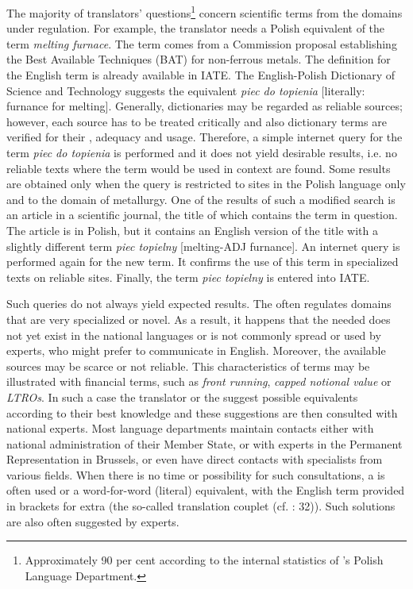 \documentclass[output=paper]{langsci/langscibook}
\begin{document}
\largerpage
The majority of translators’ questions\footnote{Approximately 90 per cent according to the internal statistics of ’s Polish Language Department.} concern scientific terms from the domains under regulation. For example, the translator needs a Polish equivalent of the term \textit{melting furnace}. The term comes from a Commission proposal establishing the Best Available Techniques (BAT) for non-ferrous metals. The definition for the English term is already available in IATE. The English-Polish Dictionary of Science and Technology \citep[692]{Berger2004} suggests the equivalent \textit{piec do topienia} [literally: furnance for melting]. Generally, dictionaries may be regarded as reliable sources; however, each source has to be treated critically and also dictionary terms are verified for their , adequacy and usage. Therefore, a simple internet query for the term \textit{piec do topienia} is performed and it does not yield desirable results, i.e. no reliable texts where the term would be used in context are found. Some results are obtained only when the query is restricted to sites in the Polish language only and to the domain of metallurgy. One of the results of such a modified search is an article in a scientific journal, the title of which contains the term in question. The article is in Polish, but it contains an English version of the title with a slightly different term \textit{piec topielny} [melting-ADJ furnance]. An internet query is performed again for the new term. It confirms the use of this term in specialized texts on reliable sites. Finally, the term \textit{piec topielny} is entered into IATE.

Such queries do not always yield expected results. The  often regulates domains that are very specialized or novel. As a result, it happens that the  needed does not yet exist in the national languages or is not commonly spread or used by experts, who might prefer to communicate in English. Moreover, the available sources may be scarce or not reliable. This characteristics of  terms may be illustrated with financial terms, such as \textit{front running}, \textit{capped notional value} or \textit{LTROs}. In such a case the translator or the  suggest possible equivalents according to their best knowledge and these suggestions are then consulted with national experts. Most language departments maintain contacts either with national administration of their Member State, or with experts in the Permanent Representation in Brussels, or even have direct contacts with specialists from various fields. When there is no time or possibility for such consultations, a  is often used or a word-for-word (literal) equivalent, with the English term provided in brackets for extra  (the so-called translation couplet (cf. \citealt{Newmark1981}: 32)). Such solutions are also often suggested by experts.
\end{document}
